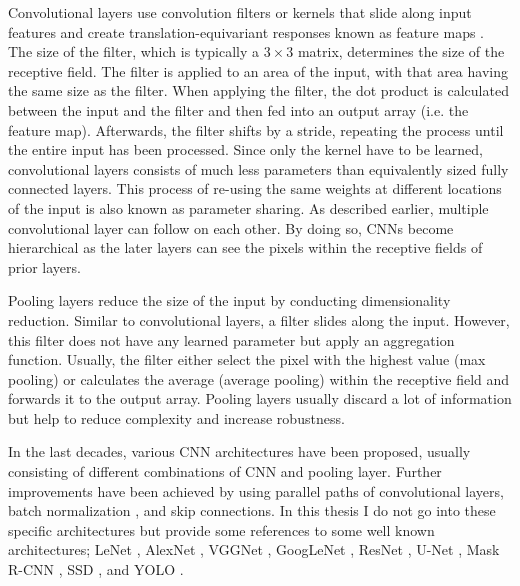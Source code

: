 Convolutional layers use convolution filters or kernels that slide along input features and create translation-equivariant responses known as feature maps .
The size of the filter, which is typically a \(3\times 3\) matrix, determines the size of the receptive field.
The filter is applied to an area of the input, with that area having the same size as the filter.
When applying the filter, the dot product is calculated between the input and the filter and then fed into an output array (i.e. the feature map).
Afterwards, the filter shifts by a stride, repeating the process until the entire input has been processed.
Since only the kernel have to be learned, convolutional layers consists of much less parameters than equivalently sized fully connected layers.
This process of re-using the same weights at different locations of the input is also known as parameter sharing.
As described earlier, multiple convolutional layer can follow on each other.
By doing so, CNNs become hierarchical as the later layers can see the pixels within the receptive fields of prior layers.

Pooling layers reduce the size of the input by conducting dimensionality reduction.
Similar to convolutional layers, a filter slides along the input.
However, this filter does not have any learned parameter but apply an aggregation function.
Usually, the filter either select the pixel with the highest value (max pooling) or calculates the average (average pooling) within the receptive field and forwards it to the output array.
Pooling layers usually discard a lot of information but help to reduce complexity and increase robustness.

In the last decades, various CNN architectures have been proposed, usually consisting of different combinations of CNN and pooling layer.
Further improvements have been achieved by using parallel paths of convolutional layers, batch normalization , and skip connections.
In this thesis I do not go into these specific architectures but provide some references to some well known architectures; LeNet , AlexNet , VGGNet , GoogLeNet , ResNet , U-Net , Mask R-CNN , SSD , and YOLO .

